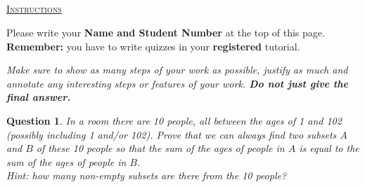 \documentclass[twoside]{article}
\theoremstyle{mystyle}
\newtheorem{quest}{Question}
\begin{document}
\begin{center}
\section*{}
\vspace{0.1in}
\large \underline{\textsc{Instructions}}
\vspace{0.1in}
\normalsize

Please write your \textbf{Name and Student Number} at the top of this page.\\

\textbf{Remember:} you have to write quizzes in your \textbf{registered} tutorial.
\vspace{0.1in}
\end{center}


\begin{center}
\textit{Make sure to show as many steps of your work as possible, justify as much and annotate any interesting steps or features of your work.  \textbf{Do not just give the final answer.}} \\
\end{center}

\begin{quest}\mbox{}
In a room there are 10 people, all between the ages of 1 and 102 (possibly including 1 and/or 102).  Prove that we can always find two subsets $A$ and $B$ of these 10 people so that the sum of the ages of people in $A$ is equal to the sum of the ages of people in $B$.\\

\textit{Hint: how many non-empty subsets are there from the 10 people?}
\end{quest}

\vspace{20pt}
\end{document}
